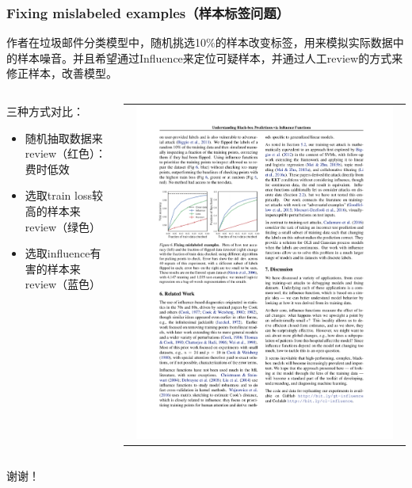 \documentclass[UTF8]{beamer}
\begin{document}
\begin{frame}
\frametitle{Fixing mislabeled examples（样本标签问题）}
作者在垃圾邮件分类模型中，随机挑选10\%的样本改变标签，用来模拟实际数据中的样本噪音。并且希望通过Influence来定位可疑样本，并通过人工review的方式来修正样本，改善模型。
\begin{columns}[T]
\begin{column}{.48\textwidth}
三种方式对比：
\begin{itemize}
\item 随机抽取数据来review（红色）：费时低效
\item 选取train loss较高的样本来review（绿色）
\item 选取influence有害的样本来review（蓝色）
\end{itemize}
\end{column}
\hfill%
\begin{column}{.48\textwidth}
\begin{tabular}{c}
\includegraphics[width=0.95\textwidth]{flip.pdf}
\end{tabular} 
\end{column}%
\end{columns}
\end{frame}
\begin{frame}
\begin{center}
谢谢！
\end{center}
\end{frame}
\end{document}
